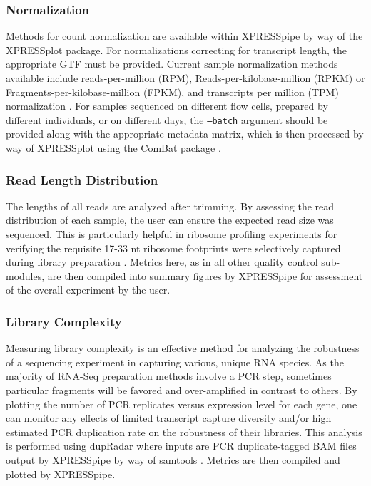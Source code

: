 \documentclass[10pt, oneside]{article}
\begin{document}
\subsubsection{Normalization}
Methods for count normalization are available within XPRESSpipe by way of the XPRESSplot package. For normalizations correcting for transcript length, the appropriate GTF must be provided. Current sample normalization methods available include reads-per-million (RPM), Reads-per-kilobase-million (RPKM) or Fragments-per-kilobase-million (FPKM), and transcripts per million (TPM) normalization \cite{evans_briefbio}. For samples sequenced on different flow cells, prepared by different individuals, or on different days, the \texttt{--batch} argument should be provided along with the appropriate metadata matrix, which is then processed by way of XPRESSplot using the ComBat package \cite{sva}.

\subsubsection{Read Length Distribution}
The lengths of all reads are analyzed after trimming. By assessing the read distribution of each sample, the user can ensure the expected read size was sequenced. This is particularly helpful in ribosome profiling experiments for verifying the requisite 17-33 nt ribosome footprints were selectively captured during library preparation \cite{ingolia_meth, fp_range}. Metrics here, as in all other quality control sub-modules, are then compiled into summary figures by XPRESSpipe for assessment of the overall experiment by the user.

\subsubsection{Library Complexity}
Measuring library complexity is an effective method for analyzing the robustness of a sequencing experiment in capturing various, unique RNA species. As the majority of RNA-Seq preparation methods involve a PCR step, sometimes particular fragments will be favored and over-amplified in contrast to others. By plotting the number of PCR replicates versus expression level for each gene, one can monitor any effects of limited transcript capture diversity and/or high estimated PCR duplication rate on the robustness of their libraries. This analysis is performed using dupRadar \cite{dupradar} where inputs are PCR duplicate-tagged BAM files output by XPRESSpipe by way of samtools \cite{samtools}. Metrics are then compiled and plotted by XPRESSpipe.
\end{document}
